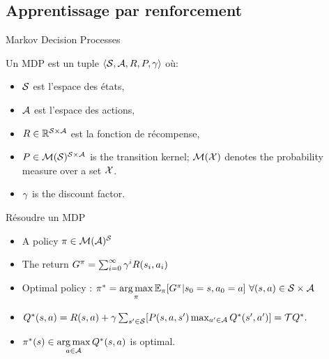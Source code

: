\documentclass[french,handout]{beamer}
\begin{document}
    \subsection{Apprentissage par renforcement}
    \begin{frame}{Markov Decision Processes}

        Un MDP est un tuple $\langle{}\mathcal{S},\mathcal{A},R,P,\gamma\rangle{}$ où:
        \begin{itemize}
            \item  $\mathcal{S}$ est l'espace des états,
            \item  $\mathcal{A}$ est l'espace des actions,
            \item $R\in\mathbb{R}^{\mathcal{S} \times \mathcal{A}}$ est la fonction de récompense,
            \item $P\in \mathcal{M}(\mathcal{S})^{\mathcal{S} \times \mathcal{A}}$ is the transition kernel; $\mathcal{M}(\mathcal{X})$ denotes the probability measure over a set $\mathcal{X}$.
            \item $\gamma$ is the discount factor.
        \end{itemize}

    \end{frame}

    \begin{frame}{Résoudre un MDP}
        \begin{itemize}
            \item A policy $\pi\in\mathcal{M}(\mathcal{A})^{\mathcal{S}}$ %
            \item The return $G^{\pi} = \sum_{i=0}^\infty \gamma^{i} R(s_{i},a_{i})$%
            \item Optimal policy :  $\pi^* = \operatorname*{arg\,max}\limits_{\pi} \mathbb{E}_{\pi} [G^{\pi}|s_0=s,a_0=a]\ \forall (s,a) \in \mathcal{S}\times\mathcal{A}$

            \item $Q^*(s,a)=R(s,a) +\gamma \sum_{s'\in \mathcal{S}}[P(s,a,s')\max_{a'\in \mathcal{A}}Q^*(s',a')] = \mathcal{T} Q^*.$

            \item $\pi^*(s) \in \operatorname*{arg\,max}\limits_{a\in \mathcal{A}} Q^*(s,a)$ is optimal.
        \end{itemize}


    \end{frame}
\end{document}
